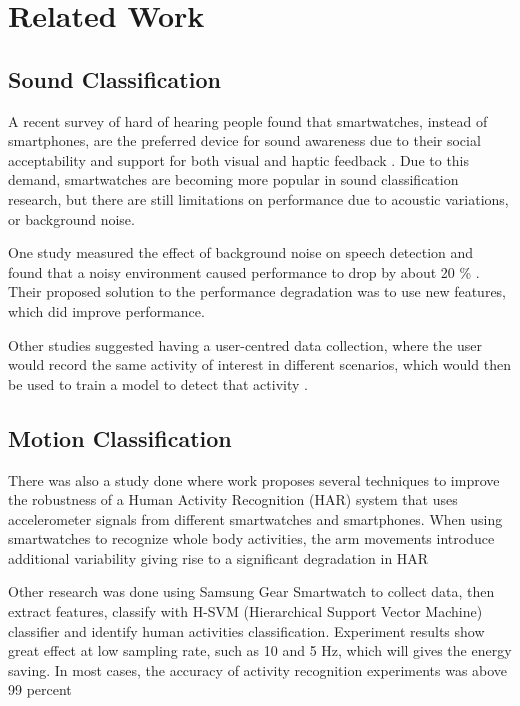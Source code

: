 \documentclass[conference]{IEEEtran}
\begin{document}
	\section{Related Work}
	\subsection{Sound Classification}
	A recent survey of hard of hearing people found that smartwatches, instead of smartphones, are the preferred device for sound awareness due to their social acceptability and support for both visual and haptic feedback \cite{2020_SoundWatch}.
	Due to this demand, smartwatches are becoming more popular in sound classification research, but there are still limitations on performance due to acoustic variations, or background noise.
	
	One study measured the effect of background noise on speech detection and found that a noisy environment caused performance to drop by about 20 \% \cite{2002_Content_Analysis}.
	Their proposed solution to the performance degradation was to use new features, which did improve performance.
	
	Other studies suggested having a user-centred data collection, where the user would record the same activity of interest in different scenarios, which would then be used to train a model to detect that activity \cite{2016_Personalizable} \cite{2020_SoundWatch}.
	
	\subsection{Motion Classification}
	There was also a study done where work proposes several techniques to improve the robustness of a Human Activity Recognition (HAR) system that uses accelerometer signals from different smartwatches and smartphones. When using smartwatches to recognize whole body activities, the arm movements introduce additional variability giving rise to a significant degradation in HAR\cite{2018watch_martphone}
	
	Other research was done using Samsung Gear Smartwatch to collect data, then extract features, classify with H-SVM (Hierarchical Support Vector Machine) classifier and identify human activities classification. Experiment results show great effect at low sampling rate, such as 10 and 5 Hz, which will gives the energy saving. In most cases, the accuracy of activity recognition experiments was above 99 percent\cite{2017_SVM}
	
\end{document}

